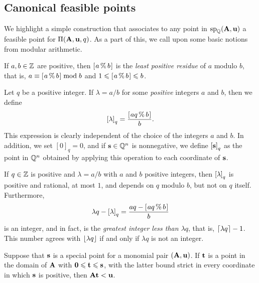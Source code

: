 \documentclass{amsart}
\begin{document}
\subsection{Canonical feasible points}

We highlight a simple construction that associates to any point in $\operatorname{sp}_{\mathbb{Q}}(\mathbf{A}, \mathbf{u})$ a feasible point for $\Pi(\mathbf{A}, \mathbf{u}, q)$.
As a part of this, we call upon some basic notions from modular arithmetic.

\begin{definition}
   If $a, b \in \mathbb{Z}$ are positive, then $[ \hspace{.01in} a \, \% \, b \hspace{.01in} ]$ is the \emph{least positive residue} of $a$ modulo $b$, that is, $a \equiv [ \hspace{.01in} a \, \% \, b \hspace{.01in} ] \bmod b$ and $1 \leqslant [ \hspace{.01in} a \, \% \, b \hspace{.01in} ] \leqslant b$.
\end{definition}

\begin{definition}
   \label{tail: D}
   Let $q$ be a positive integer.
   If $\lambda = a/b$ for some \emph{positive} integers $a$ and $b$, then we define
   \[ \left[ \lambda \right]_q = \frac{ [ \hspace{.01in} aq \, \% \, b \hspace{.01in} ]}{b}. \]
   This expression is clearly independent of the choice of the integers $a$ and $b$.
   In addition, we set  $[0]_q = 0$, and if $\mathbf{s} \in \mathbb{Q}^n$ is nonnegative, we define $\left[ \mathbf{s} \right]_q$ as the point in $\mathbb{Q}^n$ obtained by applying this operation to each coordinate of $\mathbf{s}$.
\end{definition}

\begin{remark}
   \label{tail-basics: R}
   If $q \in \mathbb{Z}$ is positive and $\lambda = a/b$ with $a$ and $b$ positive integers, then $\left[ \lambda \right]_q$ is positive and rational, at most $1$,  and depends on  $q$ modulo $b$, but not on $q$ itself.
   Furthermore,
   \[ \lambda q - \left[ \lambda \right]_q = \frac{aq-[ \hspace{.01in} aq \, \% \, b \hspace{.01in} ]}{b} \]
   is an integer, and in fact, is the \emph{greatest integer less than $\lambda q$}, that is, $\left\lceil \lambda q \right\rceil - 1$.
   This number agrees with $\left\lfloor  \lambda q \right\rfloor$ if and only if $\lambda q$ is not an integer.
\end{remark}

\begin{lemma}
   \label{less than u: L}
   Suppose that $\mathbf{s}$ is a special point for a monomial pair $(\mathbf{A}, \mathbf{u})$.
   If $\mathbf{t}$ is a point in the domain of $\mathbf{A}$ with $\mathbf{0} \leqslant \mathbf{t} \leqslant \mathbf{s}$, with the latter bound strict in every coordinate in which $\mathbf{s}$ is positive, then $\mathbf{A} \mathbf{t} < \mathbf{u}$.
\end{lemma}
\end{document}
